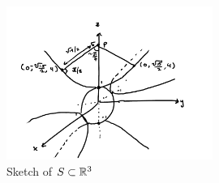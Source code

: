 \documentclass[../hw5]{subfiles}
\begin{document}
\begin{figure}[h]
	\centering
	\includegraphics[width=0.6\textwidth]{figures/handdrawn_figure.pdf}
	\caption{Sketch of $S\subset \mathbb{R}^3$}
\end{figure}
\end{document}
